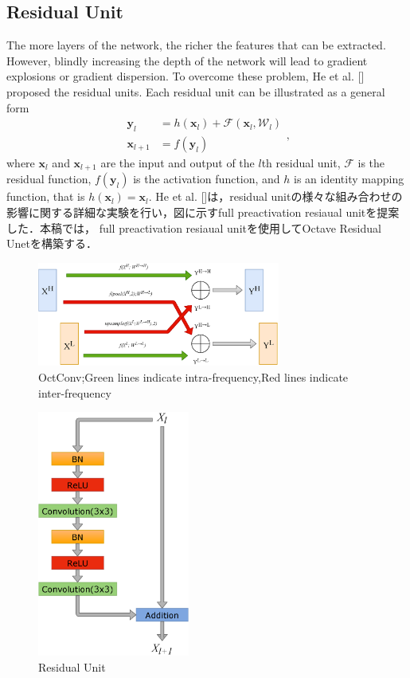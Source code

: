 \documentclass{article}
\begin{document}
\subsection{Residual Unit}
The more layers of the network, the richer the features that can be extracted. However, blindly increasing the depth of the network will lead to gradient explosions or gradient dispersion. To overcome these problem, He et al. [] proposed the residual units. Each residual unit can be illustrated as a general form  
\begin{equation}
\begin{aligned} \mathbf{y}_{l} &=h\left(\mathbf{x}_{l}\right)+\mathcal{F}\left(\mathbf{x}_{l}, \mathcal{W}_{l}\right)\\ \mathbf{x}_{l+1} &=f\left(\mathbf{y}_{l}\right) \end{aligned},
\end{equation}
where $\mathbf{x}_{l}$ and $\mathbf{x}_{l+1}$ are the input and output of the ${l}$th residual unit, $\mathcal{F}$ is the residual function, $f\left(\mathbf{y}_{l}\right)$ is the activation function, and $h$ is an identity mapping function, that is $h\left(\mathbf{x}_{l}\right)=\mathbf{x}_{l}$. He et al. []は，residual unitの様々な組み合わせの影響に関する詳細な実験を行い，図に示すfull preactivation resiaual unitを提案した．本稿では， full preactivation resiaual unitを使用してOctave Residual Unetを構築する．
\begin{figure}[t]
\begin{center}
\includegraphics[width=80mm]{fig1.eps}
\caption{OctConv;Green lines indicate intra-frequency,Red lines indicate inter-frequency }
\end{center}
\end{figure}

\begin{figure}[t]
\begin{center}
\includegraphics[width=50mm]{fig2.eps}
\caption{Residual Unit}
\end{center}
\end{figure}
\end{document}
